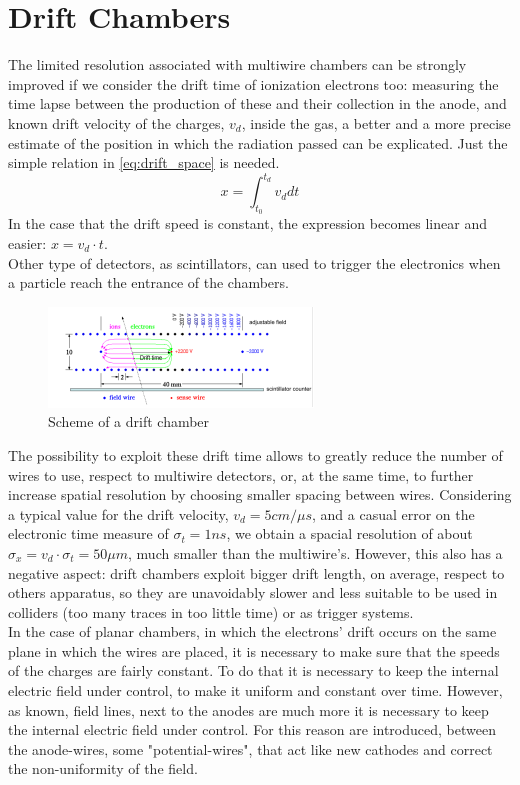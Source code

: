 \documentclass[a4paper,11pt]{book}
\begin{document}
\section{Drift Chambers}
The limited resolution associated with multiwire chambers  can be strongly improved if we consider the drift time of ionization electrons too: measuring the time lapse between the production of these and their collection in the anode, and known drift velocity of the charges, $v_d$, inside the gas, a better and a more precise estimate of the position in which the radiation passed can be explicated. Just the simple relation in \ref{eq:drift_space} is needed.
\begin{equation}
\label{eq:drift_space}
x = \int^{t_d}_{t_0} v_d dt
\end{equation}
In the case that the drift speed is constant, the expression becomes linear and easier: $x = v_d\cdot t$.\\
Other type of detectors, as scintillators, can used to trigger the electronics when a particle reach the entrance of the chambers.\\

\begin{figure}[hbtp]
\centering
\includegraphics[scale=2]{pictures/drift_chamber_scheme.pdf}
\caption{Scheme of a drift chamber}
\label{fig:drift_chamber_scheme}
\end{figure}

The possibility to exploit these drift time allows to greatly reduce the number of wires to use, respect to multiwire detectors, or, at the same time, to further increase spatial resolution by choosing smaller spacing between wires. Considering a typical value for the drift velocity, $v_d = 5 cm/\mu s$, and a casual error on the electronic time measure of $\sigma_t = 1ns$, we obtain a spacial resolution of about $\sigma_x = v_d\cdot \sigma_t = 50 \mu m$, much smaller than the multiwire's. However, this also has a negative aspect: drift chambers exploit bigger drift length, on average, respect to others apparatus, so they are unavoidably slower and less suitable to be used in colliders (too many traces in too little time) or as trigger systems.\\
In the case of planar chambers, in which the electrons' drift occurs on the same plane in which the wires are placed, it is necessary to make sure that the speeds of the charges are fairly constant. To do that it is necessary to keep the internal electric field under control, to make it uniform and constant over time. However, as known, field lines, next to the anodes are much more it is necessary to keep the internal electric field under control. For this reason are introduced, between the anode-wires, some "potential-wires", that act like new cathodes and correct the non-uniformity of the field. \\
\end{document}
